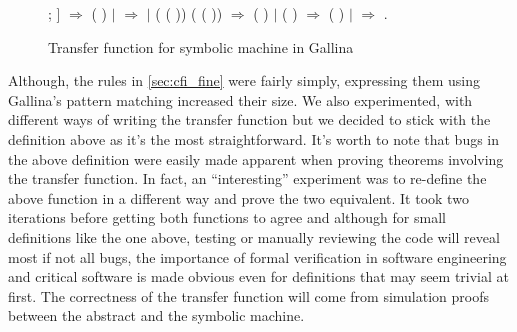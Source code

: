 \begin{figure}[htbp!]
\begin{coqdoccode}
  ; ] \ensuremath{\Rightarrow} \coqdoceol
  \coqdocindent{2.00em}  (
   )\coqdoceol \coqdocindent{1.00em}
  \ensuremath{|}   \coqdocvar{\_}
  \coqdocvar{\_} \coqdocvar{\_} \ensuremath{\Rightarrow}
  \coqdoceol \coqdocindent{1.00em} \ensuremath{|}
   \coqdocvar{\_} (
  ( )) (
  ( )) \coqdocvar{\_}
  \ensuremath{\Rightarrow} \coqdoceol \coqdocindent{2.00em}
     
    (
   ) 
  \coqdoceol \coqdocindent{1.00em} \ensuremath{|}
   \coqdocvar{\_} 
  ( \coqdocvar{\_}) \coqdocvar{\_}
  \ensuremath{\Rightarrow} \coqdoceol \coqdocindent{2.00em}
   ( 
  )\coqdoceol \coqdocindent{1.00em} \ensuremath{|}
   \coqdocvar{\_} \coqdocvar{\_} \coqdocvar{\_}
  \coqdocvar{\_} \ensuremath{\Rightarrow} \coqdoceol
  \coqdocindent{1.00em} .\coqdoceol
\end{coqdoccode}
\caption{Transfer function for symbolic machine in Gallina}
\label{fig:transfer_coq}
\end{figure}


Although, the rules in \ref{sec:cfi_fine} were fairly simply,
expressing them using Gallina's pattern matching increased their
size. We also experimented, with different ways of writing the
transfer function but we decided to stick with the definition above as
it's the most straightforward. It's worth to note that bugs in the
above definition were easily made apparent when proving theorems
involving the transfer function. In fact, an ``interesting''
experiment was to re-define the above function in a different way and
prove the two equivalent. It took two iterations before getting both
functions to agree and although for small definitions like the one
above, testing or manually reviewing the code will reveal most if not
all bugs, the importance of formal verification in software
engineering and critical software is made obvious even for definitions
that may seem trivial at first. The correctness of the transfer
function will come from simulation proofs between the abstract and the
symbolic machine.

